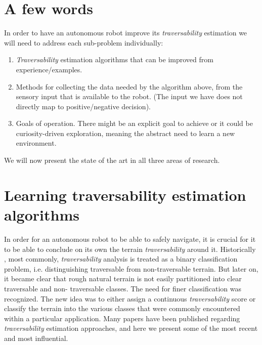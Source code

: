 \documentclass[12pt,a4paper]{report}
\newcommand{\term}{\textit}
\begin{document}
	\section{A few words}
	\label{sec:bg:intro}
	
	In order to have an autonomous robot improve its \term{traversability} 
	estimation we will need to address each sub-problem individually:
	
	\begin{enumerate}
		\item \term{Traversability} estimation algorithms that can be improved from 
		experience/examples.
		\item Methods for collecting the data needed by the algorithm above, from 
		the sensory input that is available to the robot. (The input we have does not 
		directly map to positive/negative decision).
		\item Goals of operation. There might be an explicit goal to achieve or it 
		could be curiosity-driven exploration, meaning the abstract need to learn a 
		new environment.
	\end{enumerate}
	
	We will now present the state of the art in all three areas of research.
	\\
	
	\section{Learning traversability estimation algorithms}
	\label{sec:bg:trav}
	
	In order for an autonomous robot to be able to safely navigate, it is crucial 
	for it to be able to conclude on its own the terrain \term{traversability} 
	around it. Historically \cite{Papadakis}, most commonly, \term{traversability} 
	analysis is treated as a binary classification problem, i.e. distinguishing 
	traversable from non-traversable terrain. But later on, it became clear that 
	rough natural terrain is not easily partitioned into clear traversable and non-
	traversable classes. The need for finer classification was recognized. The new 
	idea was to either assign a continuous \term{traversability} score or classify 
	the terrain into the various classes that were commonly encountered within a 
	particular application. Many papers have been published regarding 
	\term{traversability} estimation approaches, and here we present some of the 
	most recent and most influential.
	\\
	
\end{document}
